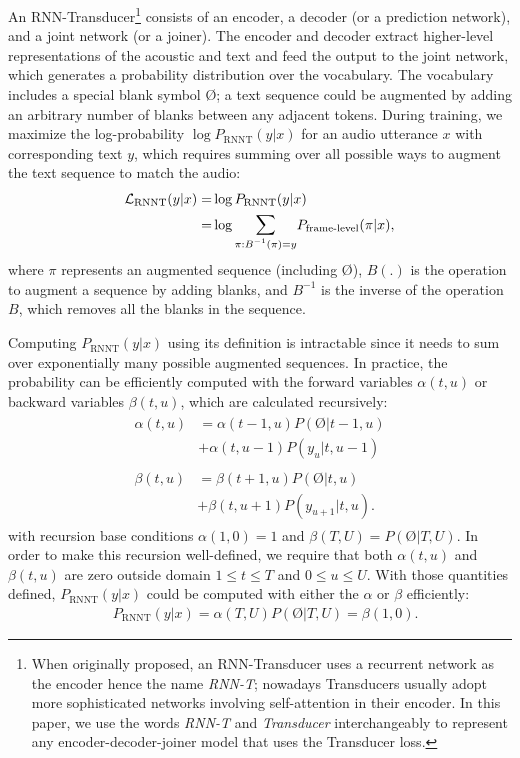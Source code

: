 \documentclass{article}
\begin{document}
An RNN-Transducer\footnote{When originally proposed, an RNN-Transducer uses a recurrent network as the encoder hence the name \emph{RNN-T};  nowadays Transducers usually adopt more sophisticated networks involving self-attention in their encoder. In this paper, we use the words \emph{RNN-T} and \emph{Transducer} interchangeably to represent any encoder-decoder-joiner model that uses the Transducer loss.} \cite{graves2012sequence} consists of an  encoder, 
a decoder (or a prediction network), and a joint network (or a joiner). 
The encoder and decoder extract higher-level representations of the acoustic and text  and feed the output to the joint network, which generates a probability distribution over the vocabulary.
The vocabulary includes a special blank symbol \O; a text sequence could be augmented by adding an arbitrary number of blanks between any adjacent tokens. During training, we maximize the log-probability $\log P_\text{RNNT}(y | x)$ for an audio utterance $x$ with corresponding text $y$, which requires summing over all possible ways to augment the text sequence to match the audio:\begin{equation}
\begin{aligned}
\mathcal{L}_\text{RNNT} (y|x) =  &  \log P_\text{RNNT}(y | x) \\
= & \log \mathlarger\sum_{\pi: B^{-1}(\pi) = y} P_\text{frame-level}(\pi | x),
\end{aligned}
\end{equation}
where $\pi$ represents an augmented sequence (including \O), 
$B(.)$ is the operation to augment a sequence by adding blanks, and $B^{-1}$ is the inverse of the operation $B$, which  
removes all the blanks in the sequence. 

Computing  $P_\text{RNNT} (y|x)$ using its definition is intractable since it needs to sum over exponentially many possible augmented sequences. In practice, the probability can be efficiently computed with the forward variables $\alpha(t, u)$ or backward variables $\beta(t, u)$, which are calculated recursively:
\begin{align}
 \begin{split}\label{alpha}
    \alpha(t, u)  &=  \alpha(t - 1, u) P(\text{\O}|t-1, u) \\
     & +  \alpha(t, u - 1) P(y_u|t, u - 1)
  \end{split} \\
  \begin{split}\label{beta}
    \beta(t, u) & =  \beta(t + 1, u) P(\text{\O}|t, u) \\
    & + \beta(t, u + 1) P(y_{u+1}|t, u).
\end{split}
\end{align}
with recursion base conditions $\alpha(1,0) = 1$ and $\beta(T, U) = P(\text{\O}| T, U)$.
In order to make this recursion well-defined, we require that  both $\alpha(t, u)$ and $\beta(t, u)$  are zero outside domain $1 \leq t \leq T$  and $0 \leq u \leq U$.
With those quantities defined,
$P_\text{RNNT}(y|x)$ could be computed with either the $\alpha$ or $\beta$ efficiently: 
\begin{align*}
& P_\text{RNNT}(y | x) = \alpha(T, U) P(\text{\O} |T, U) = \beta(1, 0).
\end{align*}
\end{document}
